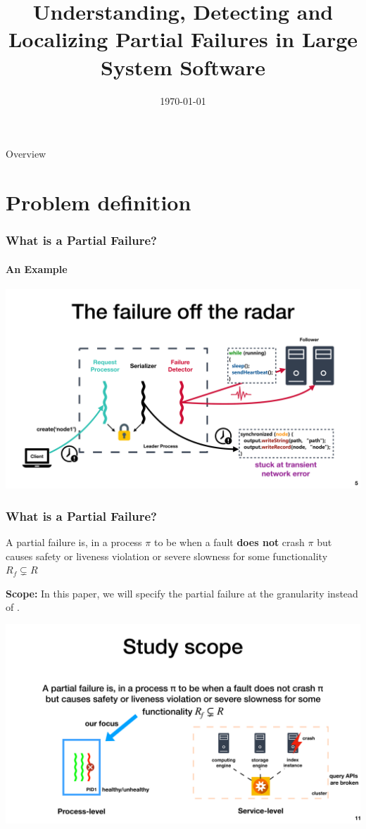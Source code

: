 \documentclass[aspectratio=169]{beamer}
\title{Understanding, Detecting and Localizing Partial Failures in Large System Software\footfullcite{lou2020understanding}}
\date{\today}
\newcommand{\red}[1]{{\color{red}{#1}}}
\newcommand{\blue}[1]{{\color{blue}{#1}}}
\begin{document}
\begin{frame}
    \titlepage
\end{frame}

\begin{frame}{Overview}
    \tableofcontents
\end{frame}

\section{Problem definition}

\begin{frame}
    \frametitle{What is a Partial Failure?}
    \framesubtitle{An Example}
    \begin{center}
        \includegraphics[width=\textwidth]{fig/example1}
    \end{center}
\end{frame}

\begin{frame}
    \frametitle{What is a Partial Failure?}
    \begin{definition}
        A partial failure is, in a process $\pi$ to be when a fault \textbf{does not} crash $\pi$ but causes safety or liveness violation or severe slowness for some functionality $R_f \subsetneq  R$

    \end{definition}
    \textbf{Scope:} In this paper, we will specify the partial failure at the \red{process} granularity instead of \blue{service}.
    \begin{center}
        \includegraphics[width=.9\textwidth]{fig/level}
    \end{center}
\end{frame}
\end{document}
